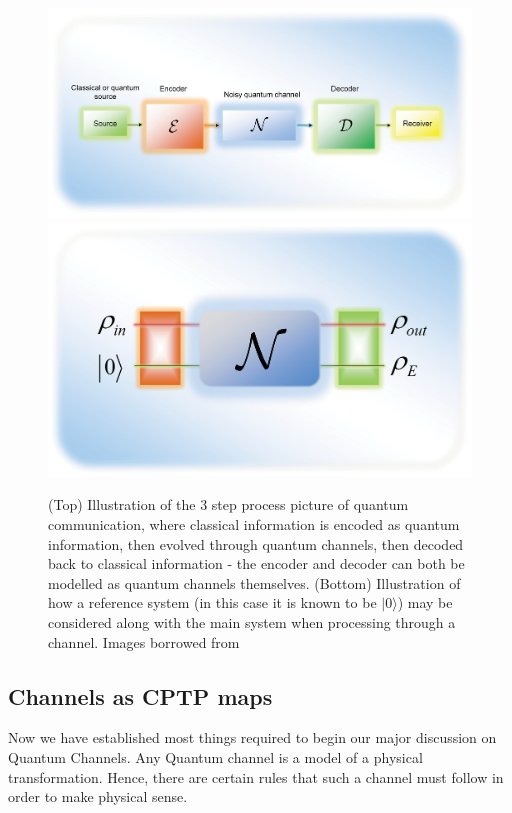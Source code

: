 \begin{figure}
    \centering
    \includegraphics[scale=0.15]{figures/channel1.png}
    \includegraphics[scale=0.12]{figures/channel2.png}
    \caption{(Top) Illustration of the 3 step process picture of quantum communication, where classical
    information is encoded as quantum information, then evolved through quantum channels, then decoded
    back to classical information - the encoder and decoder can both be modelled as quantum channels
    themselves. (Bottom) Illustration of how a reference system (in this case it is known to be $|0\rangle$)
    may be considered along with the main system when processing through a channel. Images borrowed from \cite{Gyongyosi_2018}}
    \label{channelimg}
\end{figure}

\subsection{Channels as CPTP maps}

Now we have established most things required to begin our major discussion on Quantum Channels. Any
Quantum channel is a model of a physical transformation. Hence, there are certain rules that such a
channel must follow in order to make physical sense.

